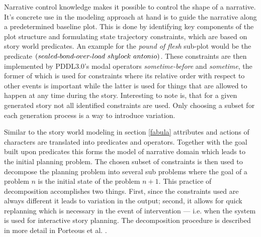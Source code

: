 Narrative control knowledge makes it possible to control the shape of a narrative. It's concrete use in the modeling approach at hand is to guide the narrative along a predetermined baseline plot. This is done by identifying key components of the plot structure and formulating state trajectory constraints, which are based on story world predicates. An example for the \emph{pound of flesh} sub-plot would be the predicate $(sealed\h bond\h over\h load\ shylock\ antonio)$. These constraints are then implemented by PDDL3.0's \cite{Gerevini09} modal operators \emph{some\-time-before} and \emph{sometime}, the former of which is used for constraints where its relative order with respect to other events is important while the latter is used for things that are allowed to happen at any time during the story. Interesting to note is, that for a given generated story not all identified constraints are used. Only choosing a subset for each generation process is a way to introduce variation.

Similar to the story world modeling in section \ref{fabula} attributes and actions of characters are translated into predicates and operators. Together with the goal built upon predicates this forms the model of narrative domain which leads to the initial planning problem. The chosen subset of constraints is then used to decompose the planning problem into several sub problems where the goal of a problem $n$ is the initial state of the problem $n+1$. This practice of decomposition accomplishes two things. First, since the constraints used are always different it leads to variation in the output; second, it allows for quick replanning which is necessary in the event of intervention --- i.e. when the system is used for interactive story planning. The decomposition procedure is described in more detail in Porteous et al. \cite{Porteous10}.

